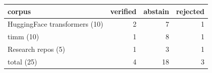 \begin{tabular}{lrrr}
\toprule
corpus & verified & abstain & rejected \\
\midrule
HuggingFace transformers (10) & 2 & 7 & 1 \\
timm (10) & 1 & 8 & 1 \\
Research repos (5) & 1 & 3 & 1 \\
\midrule
total (25) & 4 & 18 & 3 \\
\bottomrule
\end{tabular}
